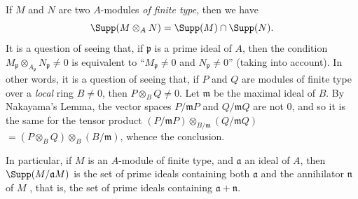 \begin{env}[1.7.5]
\label{0.1.7.5}
If $M$ and $N$ are two $A$-modules \emph{of finite type}, then we have
\[
  \Supp(M\otimes_A N)=\Supp(M)\cap\Supp(N).
\]
It is a question of seeing that, if $\mathfrak{p}$ is a prime ideal of $A$, then the condition $M_\mathfrak{p}\otimes_{A_\mathfrak{p}}N_\mathfrak{p}\neq 0$ is equivalent to ``$M_\mathfrak{p}\neq 0$ and $N_\mathfrak{p}\neq 0$'' (taking  into account).
In other words, it is a question of seeing that, if $P$ and $Q$ are modules of finite type over a \emph{local} ring $B\neq 0$, then $P\otimes_B Q\neq 0$. Let $\mathfrak{m}$ be the maximal ideal of $B$.
By Nakayama's Lemma, the vector spaces $P/\mathfrak{m}P$ and $Q/\mathfrak{m}Q$ are not $0$, and so it is the same for the tensor product $(P/\mathfrak{m}P)\otimes_{B/\mathfrak{m}}(Q/\mathfrak{m}Q)$
$=(P\otimes_B Q)\otimes_B(B/\mathfrak{m})$, whence the conclusion.

In particular, if $M$ is an $A$-module of finite type, and $\mathfrak{a}$ an ideal of $A$, then $\Supp(M/\mathfrak{a}M)$ is the set of prime ideals containing both $\mathfrak{a}$ and the annihilator $\mathfrak{n}$ of $M$ , that is, the set of prime ideals containing $\mathfrak{a}+\mathfrak{n}$.
\end{env}

